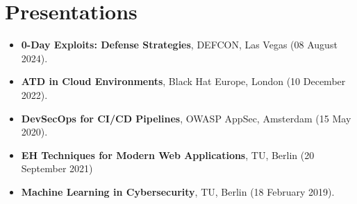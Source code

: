 
\section{Presentations}

\begin{itemize}
	\item[\textrightarrow] \textbf{0-Day Exploits: Defense Strategies}, DEFCON, Las Vegas (08 August 2024). \vspace{0.13cm}
	\item[\textrightarrow] \textbf{ATD in Cloud Environments}, Black Hat Europe, London (10 December 2022). \vspace{0.13cm}
	\item[\textrightarrow] \textbf{DevSecOps for CI/CD Pipelines}, OWASP AppSec, Amsterdam (15 May 2020). \vspace{0.13cm}
	\item[\textrightarrow] \textbf{EH Techniques for Modern Web Applications}, TU, Berlin (20 September 2021) \vspace{0.13cm}
	\item[\textrightarrow] \textbf{Machine Learning in Cybersecurity}, TU, Berlin (18 February 2019). \vspace{0.13cm}
\end{itemize}
